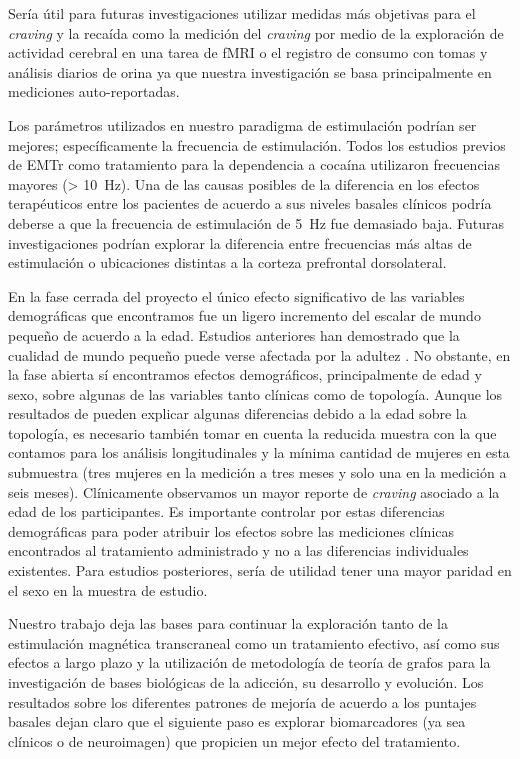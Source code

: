 Sería útil para futuras investigaciones utilizar medidas más objetivas para el \textit{craving} y la recaída \textemdash{}como la medición del \textit{craving} por medio de la exploración de actividad cerebral en una tarea de fMRI o el registro de consumo con tomas y análisis diarios de orina\textemdash{} ya que nuestra investigación se basa principalmente en mediciones auto-reportadas. \par
Los parámetros utilizados en nuestro paradigma de estimulación podrían ser mejores; específicamente la frecuencia de estimulación. Todos los estudios previos de EMTr como tratamiento para la dependencia a cocaína utilizaron frecuencias mayores (\deactivatequoting\SI{> 10}{\hertz}\activatequoting). Una de las causas posibles de la diferencia en los efectos terapéuticos entre los pacientes de acuerdo a sus niveles basales clínicos podría deberse a que la frecuencia de estimulación de \SI{5}{\hertz} fue demasiado baja. Futuras investigaciones podrían explorar la diferencia entre frecuencias más altas de estimulación o ubicaciones distintas a la corteza prefrontal dorsolateral.\par
En la fase cerrada del proyecto el único efecto significativo de las variables demográficas que encontramos fue un ligero incremento del escalar de mundo pequeño de acuerdo a la edad. Estudios anteriores han demostrado que la cualidad de mundo pequeño puede verse afectada por la adultez \parencite{Achard2007}. No obstante, en la fase abierta sí encontramos efectos demográficos, principalmente  de edad y sexo, sobre algunas de las variables tanto clínicas como de topología. Aunque los resultados de \textcite{Achard2007} pueden explicar algunas diferencias debido a la edad sobre la topología, es necesario también tomar en cuenta la reducida muestra con la que contamos para los análisis longitudinales y la mínima cantidad de mujeres en esta submuestra (tres mujeres en la medición a tres meses y solo una en la medición a seis meses). Clínicamente observamos un mayor reporte de \textit{craving} asociado a la edad de los participantes. Es importante controlar por estas diferencias demográficas para poder atribuir los efectos sobre las mediciones clínicas encontrados al tratamiento administrado y no a las diferencias individuales existentes. Para estudios posteriores, sería de utilidad tener una mayor paridad en el sexo en la muestra de estudio.\par
Nuestro trabajo deja las bases para continuar la exploración tanto de la estimulación magnética transcraneal como un tratamiento efectivo, así como sus efectos a largo plazo y la utilización de metodología de teoría de grafos para la investigación de bases biológicas de la adicción, su desarrollo y evolución. Los resultados sobre los diferentes patrones de mejoría de acuerdo a los puntajes basales dejan claro que el siguiente paso es explorar biomarcadores (ya sea clínicos o de neuroimagen) que propicien un mejor efecto del tratamiento.
